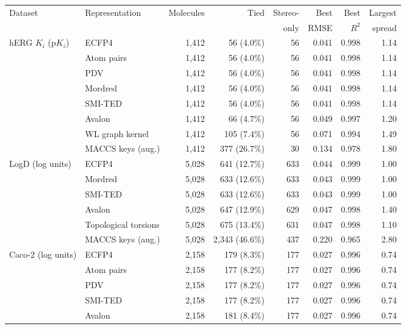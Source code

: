 \begin{table}[htbp]
\centering
\small
\setlength{\tabcolsep}{4pt}
\begin{adjustbox}{max width=\textwidth,max totalheight=0.78\textheight}
\begin{tabular}{llrrrrrr}
\toprule
Dataset & Representation & Molecules & Tied & Stereo- & Best & Best & Largest \\
 & & & & only & RMSE & $R^2$ & spread \\
\midrule
hERG $K_i$ (p$K_i$) & ECFP4 & 1,412 & 56 (4.0\%) & 56 & 0.041 & 0.998 & 1.14 \\
 & Atom pairs & 1,412 & 56 (4.0\%) & 56 & 0.041 & 0.998 & 1.14 \\
 & PDV & 1,412 & 56 (4.0\%) & 56 & 0.041 & 0.998 & 1.14 \\
 & Mordred & 1,412 & 56 (4.0\%) & 56 & 0.041 & 0.998 & 1.14 \\
 & SMI-TED & 1,412 & 56 (4.0\%) & 56 & 0.041 & 0.998 & 1.14 \\
 & Avalon & 1,412 & 66 (4.7\%) & 56 & 0.049 & 0.997 & 1.20 \\
 & WL graph kernel & 1,412 & 105 (7.4\%) & 56 & 0.071 & 0.994 & 1.49 \\
 & MACCS keys (aug.) & 1,412 & 377 (26.7\%) & 30 & 0.134 & 0.978 & 1.80 \\
\midrule
LogD (log units) & ECFP4 & 5,028 & 641 (12.7\%) & 633 & 0.044 & 0.999 & 1.00 \\
 & Mordred & 5,028 & 633 (12.6\%) & 633 & 0.043 & 0.999 & 1.00 \\
 & SMI-TED & 5,028 & 633 (12.6\%) & 633 & 0.043 & 0.999 & 1.00 \\
 & Avalon & 5,028 & 647 (12.9\%) & 629 & 0.047 & 0.998 & 1.40 \\
 & Topological torsions & 5,028 & 675 (13.4\%) & 631 & 0.047 & 0.998 & 1.10 \\
 & MACCS keys (aug.) & 5,028 & 2,343 (46.6\%) & 437 & 0.220 & 0.965 & 2.80 \\
\midrule
Caco-2 (log units) & ECFP4 & 2,158 & 179 (8.3\%) & 177 & 0.027 & 0.996 & 0.74 \\
 & Atom pairs & 2,158 & 177 (8.2\%) & 177 & 0.027 & 0.996 & 0.74 \\
 & PDV & 2,158 & 177 (8.2\%) & 177 & 0.027 & 0.996 & 0.74 \\
 & SMI-TED & 2,158 & 177 (8.2\%) & 177 & 0.027 & 0.996 & 0.74 \\
 & Avalon & 2,158 & 181 (8.4\%) & 177 & 0.027 & 0.996 & 0.74 \\

\end{tabular}
\end{adjustbox}
\end{table}
